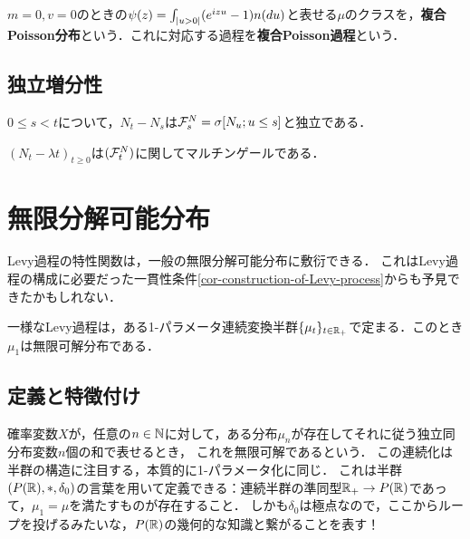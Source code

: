 \documentclass[uplatex,dvipdfmx]{jsreport}
\begin{document}
\begin{definition}
        $m=0,v=0$のときの$\psi(z)=\int_{\lvert u>0\rvert}(e^{izu}-1)n(du)$と表せる$\mu$のクラスを，\textbf{複合Poisson分布}という．これに対応する過程を\textbf{複合Poisson過程}という．
\end{definition}

\subsection{独立増分性}

\begin{proposition}
    $0\le s<t$について，$N_t-N_s$は$\mathcal{F}^N_s=\sigma[N_u;u\le s]$と独立である．
\end{proposition}

\begin{corollary}
    $(N_t-\lambda t)_{t\ge0}$は$(\mathcal{F}_t^N)$に関してマルチンゲールである．
\end{corollary}

\section{無限分解可能分布}

\begin{tcolorbox}[colframe=ForestGreen, colback=ForestGreen!10!white,breakable,colbacktitle=ForestGreen!40!white,coltitle=black,fonttitle=\bfseries\sffamily,
title=]
    Levy過程の特性関数は，一般の無限分解可能分布に敷衍できる．
    これはLevy過程の構成に必要だった一貫性条件\ref{cor-construction-of-Levy-process}からも予見できたかもしれない．

    一様なLevy過程は，ある1-パラメータ連続変換半群$\{\mu_t\}_{t\in\mathbb{R}_+}$で定まる．このとき$\mu_1$は無限可解分布である．
\end{tcolorbox}

\subsection{定義と特徴付け}

\begin{tcolorbox}[colframe=ForestGreen, colback=ForestGreen!10!white,breakable,colbacktitle=ForestGreen!40!white,coltitle=black,fonttitle=\bfseries\sffamily,
title=]
    確率変数$X$が，任意の$n\in\mathbb{N}$に対して，ある分布$\mu_n$が存在してそれに従う独立同分布変数$n$個の和で表せるとき，
    これを無限可解であるという．
    この連続化は半群の構造に注目する，本質的に1-パラメータ化に同じ．
    これは半群$(P(\mathbb{R}),*,\delta_0)$の言葉を用いて定義できる：連続半群の準同型$\mathbb{R}_+\to P(\mathbb{R})$であって，$\mu_1=\mu$を満たすものが存在すること．
    しかも$\delta_0$は極点なので，ここからループを投げるみたいな，$P(\mathbb{R})$の幾何的な知識と繋がることを表す！
\end{tcolorbox}
\end{document}
